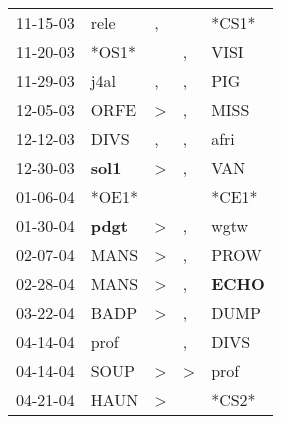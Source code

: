 \begin{supertabular}{p{0.07\textwidth}p{0.06\textwidth}p{0.02\textwidth}p{0.02\textwidth}p{0.06\textwidth}}
          11-15-03\textsuperscript{} &           rele\textsuperscript{} &                , &                  &                            *CS1* \\
          11-20-03\textsuperscript{} &                            *OS1* &                  &                , &           VISI\textsuperscript{} \\
          11-29-03\textsuperscript{} &           j4al\textsuperscript{} &                , &                , &            PIG\textsuperscript{} \\
          12-05-03\textsuperscript{} &           ORFE\textsuperscript{} &     \textgreater &                , &           MISS\textsuperscript{} \\
          12-12-03\textsuperscript{} &           DIVS\textsuperscript{} &                , &                , &           afri\textsuperscript{} \\
          12-30-03\textsuperscript{} &  \textbf{sol1\textsuperscript{}} &     \textgreater &                , &            VAN\textsuperscript{} \\
          01-06-04\textsuperscript{} &                            *OE1* &                  &                  &                            *CE1* \\
          01-30-04\textsuperscript{} &  \textbf{pdgt\textsuperscript{}} &     \textgreater &                , &           wgtw\textsuperscript{} \\
          02-07-04\textsuperscript{} &           MANS\textsuperscript{} &     \textgreater &                , &           PROW\textsuperscript{} \\
          02-28-04\textsuperscript{} &           MANS\textsuperscript{} &     \textgreater &                , &  \textbf{ECHO\textsuperscript{}} \\
          03-22-04\textsuperscript{} &           BADP\textsuperscript{} &     \textgreater &                , &           DUMP\textsuperscript{} \\
          04-14-04\textsuperscript{} &           prof\textsuperscript{} &                  &                , &           DIVS\textsuperscript{} \\
          04-14-04\textsuperscript{} &           SOUP\textsuperscript{} &     \textgreater &     \textgreater &           prof\textsuperscript{} \\
          04-21-04\textsuperscript{} &           HAUN\textsuperscript{} &     \textgreater &                  &                            *CS2* \\

\end{supertabular}
